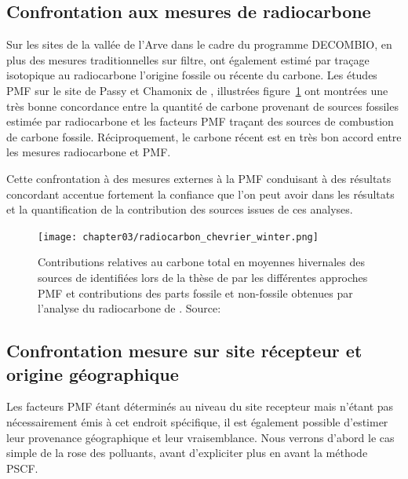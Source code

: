 \subsection{Confrontation aux mesures de radiocarbone }%
\label{sub:14c}

Sur les sites de la vallée de l'Arve dans le cadre du programme DECOMBIO, en plus des mesures
traditionnelles sur filtre, \textcite{bonvalotEstimating2016} ont également estimé par
traçage isotopique au radiocarbone  l'origine fossile ou récente du carbone.
Les études PMF sur le site de Passy et Chamonix de \textcite{chevrierChauffage2016},
illustrées figure~\ref{fig:chapter03/radiocarbon_chevrier_winter} ont
montrées une très bonne concordance entre la quantité de carbone provenant de sources
fossiles estimée par radiocarbone et les facteurs PMF traçant des sources de combustion de
carbone fossile. Réciproquement, le carbone récent est en très bon accord entre les mesures
radiocarbone et PMF.

Cette confrontation à des mesures externes à la PMF conduisant à des résultats concordant
accentue fortement la confiance que l'on peut avoir dans les résultats et la
quantification de la contribution des sources issues de ces analyses.

\begin{figure}[ht]
    \centering
    \texttt{[image: chapter03/radiocarbon\_chevrier\_winter.png]}
    \caption{Contributions relatives au carbone total en moyennes hivernales des sources
        de \PMdix{} identifiées lors de la thèse de \textcite{chevrierChauffage2016} par les
        différentes approches PMF et contributions des parts fossile et non-fossile
        obtenues par l’analyse du radiocarbone de \textcite{bonvalotEstimating2016}.
    Source: \textcite[figure 75]{chevrierChauffage2016}}%
    \label{fig:chapter03/radiocarbon_chevrier_winter}
\end{figure}

\subsection{Confrontation mesure sur site récepteur et origine géographique}%
\label{sub:confrontation_mesure_sur_site_recepteur_et_origine_geographique}

Les facteurs PMF étant déterminés au niveau du site recepteur mais n'étant pas
nécessairement émis à cet endroit spécifique, il est également possible d'estimer leur
provenance géographique et leur vraisemblance. Nous verrons d'abord le cas simple de la
rose des polluants, avant d'expliciter plus en avant la méthode PSCF.

